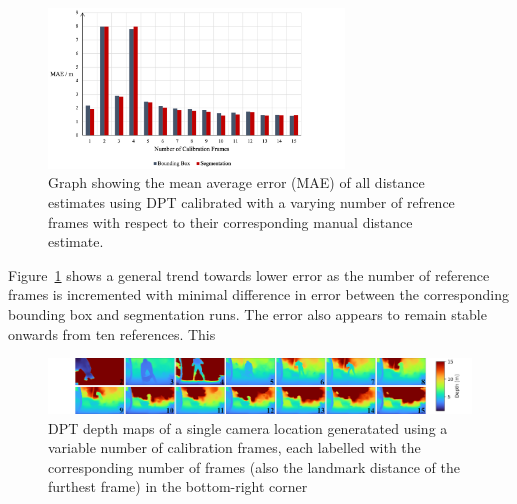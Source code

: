 \begin{figure}[H]
    \centering
    \includegraphics[width=0.7\textwidth]{body/analysis/assets/calibration_effects/MAE_var_cal}
    \caption{Graph showing the mean average error (MAE) of all distance estimates using DPT calibrated
        with a varying number of refrence frames with respect to their corresponding manual distance
        estimate.}
    \label{fig:MAE_var_cal}
\end{figure}

Figure~\ref{fig:MAE_var_cal} shows a general trend towards lower error as the number of reference
frames is incremented with minimal difference in error between the corresponding bounding box and
segmentation runs.
The error also appears to remain stable onwards from ten references.
This

\begin{figure}[H]
    \centering
    \includegraphics[width=1\textwidth]{body/analysis/assets/calibration_effects/variable_calibation}
    \caption{DPT depth maps of a single camera location generatated using a variable number of
        calibration frames, each labelled with the corresponding number of frames (also the landmark
        distance of the furthest frame) in the bottom-right corner}
    \label{fig:variable_calibration}
\end{figure}
